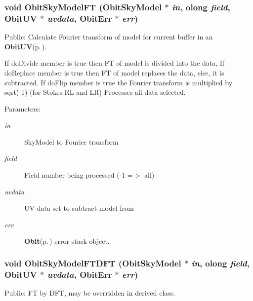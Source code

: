 \subsubsection{\setlength{\rightskip}{0pt plus 5cm}void Obit\-Sky\-Model\-FT ({\bf Obit\-Sky\-Model} $\ast$ {\em in}, {\bf olong} {\em field}, {\bf Obit\-UV} $\ast$ {\em uvdata}, {\bf Obit\-Err} $\ast$ {\em err})}\label{ObitSkyModel_8c_a25}


Public: Calculate Fourier transform of model for current buffer in an {\bf Obit\-UV}{\rm (p.\,\pageref{structObitUV})}. 

If do\-Divide member is true then FT of model is divided into the data, If do\-Replace member is true then FT of model replaces the data, else, it is subtracted. If do\-Flip member is true the Fourier transform is multiplied by sqrt(-1) (for Stokes RL and LR) Processes all data selected. \begin{Desc}
\item[Parameters:]
\begin{description}
\item[{\em in}]Sky\-Model to Fourier transform \item[{\em field}]Field number being processed (-1 =$>$ all) \item[{\em uvdata}]UV data set to subtract model from \item[{\em err}]{\bf Obit}{\rm (p.\,\pageref{structObit})} error stack object. \end{description}
\end{Desc}
\subsubsection{\setlength{\rightskip}{0pt plus 5cm}void Obit\-Sky\-Model\-FTDFT ({\bf Obit\-Sky\-Model} $\ast$ {\em in}, {\bf olong} {\em field}, {\bf Obit\-UV} $\ast$ {\em uvdata}, {\bf Obit\-Err} $\ast$ {\em err})}\label{ObitSkyModel_8c_a28}


Public: FT by DFT, may be overridden in derived class. 

